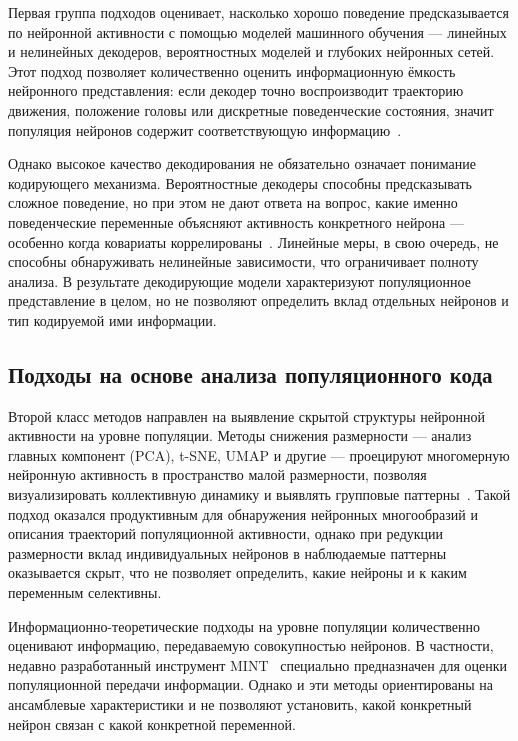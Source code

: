 Первая группа подходов оценивает, насколько хорошо поведение предсказывается по нейронной активности с помощью моделей машинного обучения --- линейных и нелинейных декодеров, вероятностных моделей и глубоких нейронных сетей. Этот подход позволяет количественно оценить информационную ёмкость нейронного представления: если декодер точно воспроизводит траекторию движения, положение головы или дискретные поведенческие состояния, значит популяция нейронов содержит соответствующую информацию~\cite{DayanAbbott2001}.

Однако высокое качество декодирования не обязательно означает понимание кодирующего механизма.
Вероятностные декодеры способны предсказывать сложное поведение, но при этом не дают ответа на вопрос, какие именно поведенческие переменные объясняют активность конкретного нейрона --- особенно когда ковариаты коррелированы~\cite{Kriegeskorte2019}.
Линейные меры, в свою очередь, не способны обнаруживать нелинейные зависимости, что ограничивает полноту анализа. В результате декодирующие модели характеризуют популяционное представление в целом, но не позволяют определить вклад отдельных нейронов и тип кодируемой ими информации.


\subsection{Подходы на основе анализа популяционного кода}
\label{sec:population_approaches}

Второй класс методов направлен на выявление скрытой структуры нейронной активности на уровне популяции. Методы снижения размерности --- анализ главных компонент (PCA), t-SNE, UMAP и другие --- проецируют многомерную нейронную активность в пространство малой размерности, позволяя визуализировать коллективную динамику и выявлять групповые паттерны~\cite{Cunningham2014}. Такой подход оказался продуктивным для обнаружения нейронных многообразий и описания траекторий популяционной активности, однако при редукции размерности вклад индивидуальных нейронов в наблюдаемые паттерны оказывается скрыт, что не позволяет определить, какие нейроны и к каким переменным селективны.

Информационно-теоретические подходы на уровне популяции количественно оценивают информацию, передаваемую совокупностью нейронов. В частности, недавно разработанный инструмент MINT~\cite{Lorenz2025} специально предназначен для оценки популяционной передачи информации. Однако и эти методы ориентированы на ансамблевые характеристики и не позволяют установить, какой конкретный нейрон связан с какой конкретной переменной.

